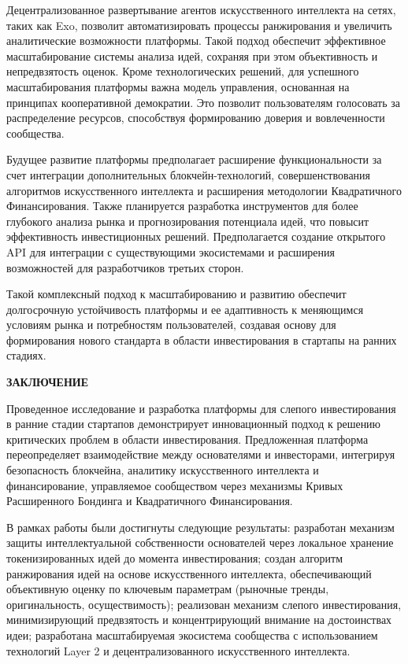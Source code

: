 \documentclass[
    candidate, %
    subf, %
]{disser}
\begin{document}
Децентрализованное развертывание агентов искусственного интеллекта на сетях, таких как Exo, позволит автоматизировать процессы ранжирования и увеличить аналитические возможности платформы. Такой подход обеспечит эффективное масштабирование системы анализа идей, сохраняя при этом объективность и непредвзятость оценок. Кроме технологических решений, для успешного масштабирования платформы важна модель управления, основанная на принципах кооперативной демократии. Это позволит пользователям голосовать за распределение ресурсов, способствуя формированию доверия и вовлеченности сообщества.

Будущее развитие платформы предполагает расширение функциональности за счет интеграции дополнительных блокчейн-технологий, совершенствования алгоритмов искусственного интеллекта и расширения методологии Квадратичного Финансирования. Также планируется разработка инструментов для более глубокого анализа рынка и прогнозирования потенциала идей, что повысит эффективность инвестиционных решений. Предполагается создание открытого API для интеграции с существующими экосистемами и расширения возможностей для разработчиков третьих сторон.

Такой комплексный подход к масштабированию и развитию обеспечит долгосрочную устойчивость платформы и ее адаптивность к меняющимся условиям рынка и потребностям пользователей, создавая основу для формирования нового стандарта в области инвестирования в стартапы на ранних стадиях.

\newpage
\begin{center}
  \textbf{\large ЗАКЛЮЧЕНИЕ}
\end{center}

Проведенное исследование и разработка платформы для слепого инвестирования в ранние стадии стартапов демонстрирует инновационный подход к решению критических проблем в области инвестирования. Предложенная платформа переопределяет взаимодействие между основателями и инвесторами, интегрируя безопасность блокчейна, аналитику искусственного интеллекта и финансирование, управляемое сообществом через механизмы Кривых Расширенного Бондинга и Квадратичного Финансирования.

В рамках работы были достигнуты следующие результаты: разработан механизм защиты интеллектуальной собственности основателей через локальное хранение токенизированных идей до момента инвестирования; создан алгоритм ранжирования идей на основе искусственного интеллекта, обеспечивающий объективную оценку по ключевым параметрам (рыночные тренды, оригинальность, осуществимость); реализован механизм слепого инвестирования, минимизирующий предвзятость и концентрирующий внимание на достоинствах идеи; разработана масштабируемая экосистема сообщества с использованием технологий Layer 2 и децентрализованного искусственного интеллекта.
\end{document}
